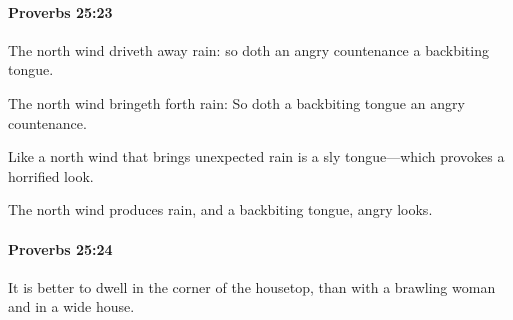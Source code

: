 		\paragraph{Proverbs 25:23} %
			\label{PROVERBS-25-23}

			The north wind driveth away rain: so doth an angry countenance a backbiting tongue.

			\begin{versebox}
					\item[BHS] 
					\item[ASV] The north wind bringeth forth rain: So doth a backbiting tongue an angry countenance.
					\item[NIV] Like a north wind that brings unexpected rain is a sly tongue—which provokes a horrified look.
					\item[NRSV] The north wind produces rain, and a backbiting tongue, angry looks.
			\end{versebox}

		\paragraph{Proverbs 25:24} %
			\label{PROVERBS-25-24}

			It is better to dwell in the corner of the housetop, than with a brawling woman and in a wide house.

